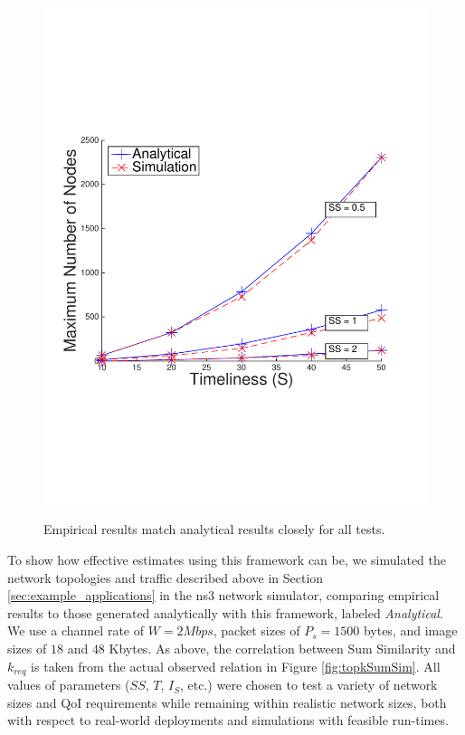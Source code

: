 \begin{figure}[]
{        \includegraphics[scale=0.40, clip=true, trim=12mm 65mm 20mm 65mm]{figures/scal_sim_results/color_2d/grid_uni_2d_qoi_vs_non_color_multiple.pdf}
        \label{fig:scal_vs_qoi_grid}
        }
   \caption{Empirical results match analytical results closely for all tests.}
   \label{fig:scal_vs_qoi}
\end{figure}

To show how effective estimates using this framework can be, we simulated the network topologies and traffic described above in Section \ref{sec:example_applications} in the ns3 network simulator, comparing empirical results to those generated analytically with this framework, labeled \emph{Analytical}.  
We use a channel rate of $W= 2 Mbps$, packet sizes of $P_s = 1500$ bytes, and image sizes of $18$ and $48$ Kbytes.  As above, the correlation between Sum Similarity and $k_{req}$ is taken from the actual observed relation in Figure \ref{fig:topkSumSim}.  All values of parameters ($SS$, $T$, $I_S$, etc.) were chosen to test a variety of network sizes and QoI requirements while remaining within realistic network sizes, both with respect to real-world deployments and simulations with feasible run-times.

